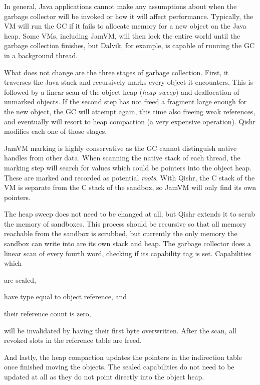 \documentclass[a4paper,12pt,twoside,openright]{report}
\begin{document}
In general, Java applications cannot make any assumptions about when the garbage collector will be invoked or how it will affect performance. Typically, the VM will run the GC if it fails to allocate memory for a new object on the Java heap. Some VMs, including JamVM, will then lock the entire world until the garbage collection finishes, but Dalvik, for example, is capable of running the GC in a background thread. 

What does not change are the three stages of garbage collection. First, it traverses the Java stack and recursively marks every object it encounters. This is followed by a linear scan of the object heap (\emph{heap sweep}) and deallocation of unmarked objects. If the second step has not freed a fragment large enough for the new object, the GC will attempt again, this time also freeing weak references, and eventually will resort to heap compaction (a very expensive operation). Qishr modifies each one of those stages.

JamVM marking is highly conservative as the GC cannot distinguish native handles from other data. When scanning the native stack of each thread, the marking step will search for values which could be pointers into the object heap. These are marked and recorded as potential \emph{roots}. With Qishr, the C stack of the VM is separate from the C stack of the sandbox, so JamVM will only find its own pointers.

The heap sweep does not need to be changed at all, but Qishr extends it to scrub the memory of sandboxes. This process should be recursive so that all memory reachable from the sandbox is scrubbed, but currently the only memory the sandbox can write into are its own stack and heap. The garbage collector does a linear scan of every fourth word, checking if its capability tag is set. Capabilities which 
\begin{inparaenum}
\item are sealed,
\item have type equal to object reference, and
\item their reference count is zero,
\end{inparaenum}
will be invalidated by having their first byte overwritten. After the scan, all revoked slots in the reference table are freed.

And lastly, the heap compaction updates the pointers in the indirection table once finished moving the objects. The sealed capabilities do not need to be updated at all as they do not point directly into the object heap.
\end{document}
